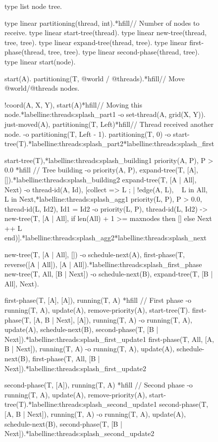 \begin{figure}[!htb]
\begin{LineCode}[commandchars=*\{\}]
type list node tree.

type linear partitioning(thread, int).*hfill// Number of nodes to receive.
type linear start-tree(thread).
type linear new-tree(thread, tree, tree).
type linear expand-tree(thread, tree).
type linear first-phase(thread, tree, tree).
type linear second-phase(thread, tree).
type linear start(node).

start(A).
partitioning(T, @world / @threads).*hfill// Move @world/@threads nodes.

!coord(A, X, Y), start(A)*hfill// Moving this node.*label{line:threads:splash_part1}
   -o set-thread(A, grid(X, Y)).
just-moved(A), partitioning(T, Left)*hfill// Thread received another node.
   -o partitioning(T, Left - 1).
partitioning(T, 0) -o start-tree(T).*label{line:threads:splash_part2}*label{line:threads:splash_first}

start-tree(T),*label{line:threads:splash_building1} priority(A, P), P > 0.0 *hfill{} // Tree building
   -o priority(A, P), expand-tree(T, [A], []).*label{line:threads:splash_building2}
expand-tree(T, [A | All], Next)
   -o thread-id(A, Id),
      [collect => L ; | !edge(A, L), ~ L in All, ~ L in Next,*label{line:threads:splash_agg1} priority(L, P), P > 0.0,
         thread-id(L, Id2), Id1 = Id2 -o priority(L, P), thread-id(L, Id2) ->
         new-tree(T, [A | All],
            if len(All) + 1 >= maxnodes then [] else Next ++ L end)].*label{line:threads:splash_agg2}*label{line:threads:splash_next}

new-tree(T, [A | All], [])
   -o schedule-next(A), first-phase(T, reverse([A | All]), [A | All]).*label{line:threads:splash_first_phase}
new-tree(T, All, [B | Next])
   -o schedule-next(B), expand-tree(T, [B | All], Next).

first-phase(T, [A], [A]), running(T, A) *hfill{} // First phase
   -o running(T, A), update(A), remove-priority(A), start-tree(T).
first-phase(T, [A, B | Next], [A]), running(T, A)
   -o running(T, A), update(A), schedule-next(B), second-phase(T, [B | Next]).*label{line:threads:splash_first_update1}
first-phase(T, All, [A, B | Next]), running(T, A)
   -o running(T, A), update(A), schedule-next(B), first-phase(T, All, [B | Next]).*label{line:threads:splash_first_update2}

second-phase(T, [A]), running(T, A) *hfill{} // Second phase
   -o running(T, A), update(A), remove-priority(A), start-tree(T).*label{line:threads:splash_second_update1}
second-phase(T, [A, B | Next]), running(T, A)
   -o running(T, A), update(A), schedule-next(B), second-phase(T, [B | Next]).*label{line:threads:splash_second_update2}
\end{LineCode}

  \label{code:threads:sbp}
\end{figure}

